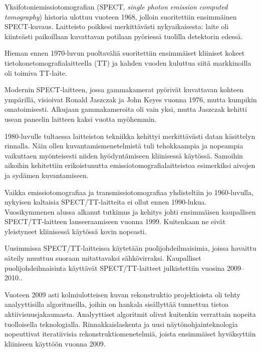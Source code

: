 Yksifotoniemissiotomografian (SPECT, \textit{single photon emission computed tomography}) historia ulottuu vuoteen 1968, jolloin suoritettiin ensimmäinen SPECT-kuvaus. Laitteisto poikkesi merkittävästi nykyaikaisesta: laite oli kiinteästi paikoillaan kuvattavan potilaan pyöriessä tuolilla detektorin edessä.\cite{jaszczak_early_2006, hutton_origins_2014}

Hieman ennen 1970-luvun puoltaväliä suoritettiin ensimmäiset kliiniset kokeet tietokonetomografialaitteella\cite{bercovich_medical_2018} (TT) ja kahden vuoden kuluttua siitä markkinoilla oli toimiva TT-laite\cite{hutton_origins_2014, willemink_evolution_2019}.

Modernin SPECT-laitteen, jossa gammakamerat pyörivät kuvattavan kohteen ympärillä, visioivat Ronald Jaszczak ja John Keyes vuonna 1976, mutta kumpikin omatoimisesti\cite{jaszczak_early_2006}. Alkujaan gammakameroita oli vain yksi, mutta Jaszczak kehitti usean paneelin laitteen kaksi vuotta myöhemmin\cite{jaszczak_early_2006, hutton_origins_2014}.

1980-luvulle tultaessa laitteiston tekniikka kehittyi merkittävästi datan käsittelyn rinnalla. Näin ollen kuvantamismenetelmistä tuli tehokkaampia ja nopeampia vaikuttaen myönteisesti niiden hyödyntämiseen kliinisessä käytössä\cite{jaszczak_early_2006}. Samoihin aikoihin kehitettiin erikoistunutta emissiotomografialaitteistoa esimerkiksi aivojen ja sydämen kuvantamiseen\cite{hutton_origins_2014}.

Vaikka emissiotomografiaa ja transmissiotomografiaa yhdisteltiin jo 1960-luvulla, nykyisen kaltaisia SPECT/TT-laitteita ei ollut ennen 1990-lukua. Vuosikymmenen alussa alkanut tutkimus ja kehitys johti ensimmäisen kaupallisen SPECT/TT-laitteen lanseeraamiseen vuonna 1999. Kuitenkaan ne eivät yleistyneet kliinisessä käytössä kovin nopeasti.\cite{hutton_origins_2014}

Uusimmissa SPECT/TT-laitteissa käytetään puolijohdeilmaisimia, joissa havaittu säteily muuttuu suoraan mitattavaksi sähkövirraksi. Kaupalliset puolijohdeilmaisinta käyttävät SPECT/TT-laitteet julkistettiin vuosina 2009--2010.\cite{hutton_origins_2014}.

Vuoteen 2009 asti kolmiulotteisen kuvan rekonstruktio projektioista oli tehty analyyttisilla algoritmeilla, joihin on hankala sisällyttää tunnettua tietoa aktiivisuusjakaumasta. Analyyttiset algoritmit olivat kuitenkin verrattain nopeita tuolloisella teknologialla. Rinnakkaislaskenta ja uusi näytönohjainteknologia nopeuttivat iteratiivisia rekonstruktiomenetelmiä, joista ensimmäiset hyväksyttiin kliiniseen käyttöön vuonna 2009.\cite{willemink_evolution_2019}

